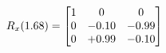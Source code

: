 \documentclass[preview]{standalone}
\begin{document}
\begin{align*}
\special{dvisvgm:raw <g id='unique000'>}R_{x}(1.68) = \begin{bmatrix}1 & 0 & 0 \\0 & -0.10 & -0.99 \\0 & +0.99 & -0.10\end{bmatrix}\special{dvisvgm:raw </g>}
\end{align*}
\end{document}
